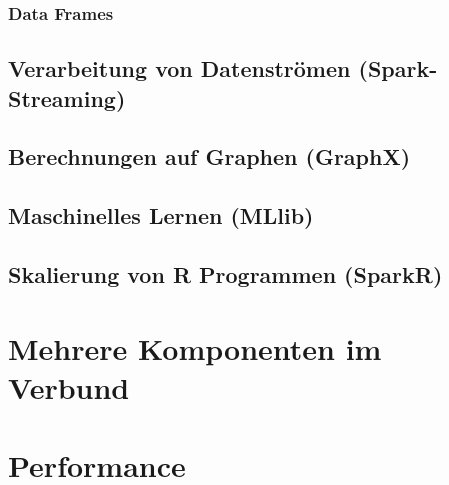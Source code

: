 \documentclass[hyperref={pdfpagelabels=false}]{beamer}
\begin{document}
\subsubsection{Data Frames}
\begin{frame} 

\end{frame}

\subsection{  Verarbeitung von Datenströmen (Spark-Streaming)}
\begin{frame} 

\end{frame}


\subsection{  Berechnungen auf Graphen (GraphX)}
\begin{frame} 

\end{frame}

\subsection{  Maschinelles Lernen (MLlib)}
\begin{frame} 

\end{frame}

\subsection{  Skalierung von R Programmen (SparkR)}
\begin{frame} 

\end{frame}



\section{Mehrere Komponenten im Verbund}
\begin{frame} 

\end{frame}

\section{  Performance}
\begin{frame} 

\end{frame}
\end{document}
